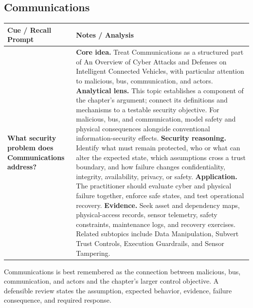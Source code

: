 \documentclass[11pt]{article}
\newcommand{\CornellHeader}{%
\rowcolor{Navy}\color{white}\bfseries Cue / Recall Prompt & \color{white}\bfseries Notes / Analysis\\\hline}
\newcommand{\CornellRow}[2]{%
\cellcolor{CueGray}\RaggedRight\textbf{#1} & \RaggedRight #2\\\hline}
\begin{document}
\subsection*{Communications}
\begin{longtable}{>{\RaggedRight\arraybackslash}p{}|>{\RaggedRight\arraybackslash}p{}}
\CornellHeader
\CornellRow{What security problem does Communications address?}{\textbf{Core idea.} Treat Communications as a structured part of An Overview of Cyber Attacks and Defenses on Intelligent Connected Vehicles, with particular attention to malicious, bus, communication, and actors. \textbf{Analytical lens.} This topic establishes a component of the chapter's argument; connect its definitions and mechanisms to a testable security objective. For malicious, bus, and communication, model safety and physical consequences alongside conventional information-security effects. \textbf{Security reasoning.} Identify what must remain protected, who or what can alter the expected state, which assumptions cross a trust boundary, and how failure changes confidentiality, integrity, availability, privacy, or safety. \textbf{Application.} The practitioner should evaluate cyber and physical failure together, enforce safe states, and test operational recovery. \textbf{Evidence.} Seek asset and dependency maps, physical-access records, sensor telemetry, safety constraints, maintenance logs, and recovery exercises. Related subtopics include Data Manipulation, Subvert Trust Controls, Execution Guardrails, and Sensor Tampering.}
\end{longtable}
\begin{topicsummary}
Communications is best remembered as the connection between malicious, bus, communication, and actors and the chapter's larger control objective. A defensible review states the assumption, expected behavior, evidence, failure consequence, and required response.
\end{topicsummary}
\end{document}
